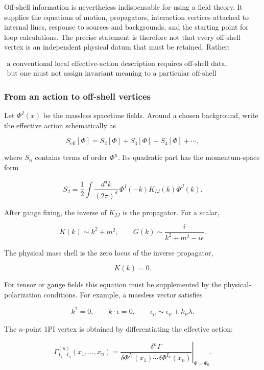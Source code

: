 \documentclass[
  10pt,
  a4paper,
  openany]{book}
\begin{document}
Off-shell information is nevertheless indispensable for using a field
theory. It supplies the equations of motion, propagators, interaction
vertices attached to internal lines, response to sources and
backgrounds, and the starting point for loop calculations. The precise
statement is therefore not that every off-shell vertex is an independent
physical datum that must be retained. Rather:

\[
\boxed{
\begin{gathered}
\text{a conventional local effective-action description requires off-shell data,}\\
\text{but one must not assign invariant meaning to a particular off-shell continuation.}
\end{gathered}
}
\]

\subsubsection{From an action to off-shell
vertices}\label{from-an-action-to-off-shell-vertices}

Let \(\Phi^I(x)\) be the massless spacetime fields. Around a chosen
background, write the effective action schematically as

\[
S_{\mathrm{eff}}[\Phi]
=S_2[\Phi]+S_3[\Phi]+S_4[\Phi]+\cdots,
\]

where \(S_n\) contains terms of order \(\Phi^n\). Its quadratic part has
the momentum-space form

\[
S_2
=\frac12\int\frac{d^dk}{(2\pi)^d}\,
\Phi^I(-k)K_{IJ}(k)\Phi^J(k).
\]

After gauge fixing, the inverse of \(K_{IJ}\) is the propagator. For a
scalar,

\[
K(k)\sim k^2+m^2,
\qquad
G(k)\sim\frac{i}{k^2+m^2-i\epsilon}.
\]

The physical mass shell is the zero locus of the inverse propagator,

\[
K(k)=0.
\]

For tensor or gauge fields this equation must be supplemented by the
physical-polarization conditions. For example, a massless vector
satisfies

\[
k^2=0,
\qquad
k\cdot\epsilon=0,
\qquad
\epsilon_\mu\sim\epsilon_\mu+k_\mu\lambda.
\]

The \(n\)-point 1PI vertex is obtained by differentiating the effective
action:

\[
\Gamma^{(n)}_{I_1\cdots I_n}(x_1,\ldots,x_n)
=
\left.
\frac{\delta^n\Gamma}
{\delta\Phi^{I_1}(x_1)\cdots\delta\Phi^{I_n}(x_n)}
\right|_{\Phi=\Phi_0}.
\]
\end{document}
